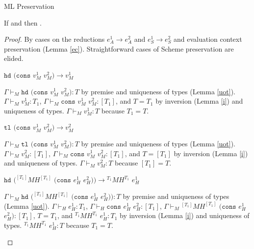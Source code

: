 \begin{theorem}{ML Preservation}

\label{thmpnm}

If \judem{\env}{\first{\varexpm}}{\first{\vartym}} and \first{\varexpm} \red \second{\varexpm} then \judem{\env}{\second{\varexpm}}{\first{\vartym}}.

\begin{proof}

By cases on the reductions $e_{A}^{1}\rightarrow e_{A}^{2}$ and $e_{S}^{1}\rightarrow e_{S}^{2}$ and evaluation context preservation (Lemma \ref{ec}).  Straightforward cases of Scheme preservation are elided.


\begin{case}
$\mathtt{hd}$ $(\mathtt{cons}$ $v_{M}^{1}$ $v_{M}^{2})\rightarrow v_{M}^{1}$

$\Gamma\vdash_{M}\mathtt{hd}$ $(\mathtt{cons}$ $v_{M}^{1}$ $v_{M}^{2}):T$ by premise and uniqueness of types (Lemma \ref{uot}).  $\Gamma\vdash_{M}v_{M}^{1}:T_{1}$, $\Gamma\vdash_{M}\mathtt{cons}$ $v_{M}^{1}$ $v_{M}^{2}:[T_{1}]$, and $T=T_{1}$ by inversion (Lemma \ref{i}) and uniqueness of types.  $\Gamma\vdash_{M}v_{M}^{1}:T$ because $T_{1}=T$.
\end{case}


\begin{case}
$\mathtt{tl}$ $(\mathtt{cons}$ $v_{M}^{1}$ $v_{M}^{2})\rightarrow v_{M}^{2}$

$\Gamma\vdash_{M}\mathtt{tl}$ $(\mathtt{cons}$ $v_{M}^{1}$ $v_{M}^{2}):T$ by premise and uniqueness of types (Lemma \ref{uot}).  $\Gamma\vdash_{M}v_{M}^{2}:[T_{1}]$, $\Gamma\vdash_{M}\mathtt{cons}$ $v_{M}^{1}$ $v_{M}^{2}:[T_{1}]$, and $T=[T_{1}]$ by inversion (Lemma \ref{i}) and uniqueness of types.  $\Gamma\vdash_{M}v_{M}^{2}:T$ because $[T_{1}]=T$.
\end{case}


\begin{case}
$\mathtt{hd}$ $(^{[T_{1}]}MH^{[T_{1}]}$ $(\mathtt{cons}$ $e_{H}^{1}$ $e_{H}^{2}))\rightarrow{^{T_{1}}M}H^{T_{1}}$ $e_{H}^{1}$

$\Gamma\vdash_{M}\mathtt{hd}$ $(^{[T_{1}]}MH^{[T_{1}]}$ $(\mathtt{cons}$ $e_{H}^{1}$ $e_{H}^{2})):T$ by premise and uniqueness of types (Lemma \ref{uot}).  $\Gamma\vdash_{H}e_{H}^{1}:T_{1}$, $\Gamma\vdash_{H}\mathtt{cons}$ $e_{H}^{1}$ $e_{H}^{2}:[T_{1}]$, $\Gamma\vdash_{M}{^{[T_{1}]}M}H^{[T_{1}]}$ $(\mathtt{cons}$ $e_{H}^{1}$ $e_{H}^{2}):[T_{1}]$, $T=T_{1}$, and $^{T_{1}}MH^{T_{1}}$ $e_{H}^{1}:T_{1}$ by inversion (Lemma \ref{i}) and uniqueness of types.  $^{T_{1}}MH^{T_{1}}$ $e_{H}^{1}:T$ because $T_{1}=T$.
\end{case}


\end{proof}
\end{theorem}
